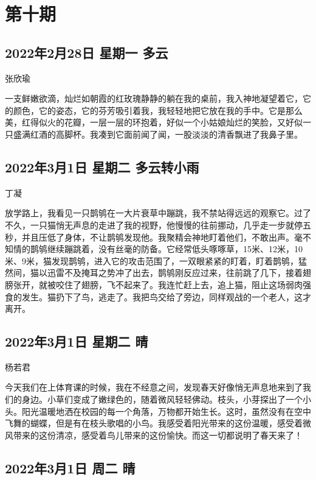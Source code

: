 \chapter{第十期}

\section{2022年2月28日 星期一 多云}

张欣瑜

一支鲜嫩欲滴，灿烂如朝霞的红玫瑰静静的躺在我的桌前，我入神地凝望着它，它的颜色，它的姿态，它的芬芳吸引着我，我轻轻地把它放在我的手中。它是那么美，红得似火的花瓣，一层一层的环抱着，好似一个小姑娘灿烂的笑脸，又好似一只盛满红酒的高脚杯。我凑到它面前闻了闻，一股淡淡的清香飘进了我鼻子里。

\section{2022年3月1日 星期二 多云转小雨}

丁凝

放学路上，我看见一只鹊鸲在一大片衰草中蹦跳，我不禁站得远远的观察它。过了不久，一只猫悄无声息的走进了我的视野，他慢慢的往前挪动，几乎走一步就停五秒，并且压低了身体，不让鹊鸲发现他。我聚精会神地盯着他们，不敢出声。毫不知情的鹊鸲继续蹦跳着，没有丝毫的防备。它经常低头啄啄草，15米、12米，10米、9米，猫发现鹊鸲，进入它的攻击范围了，一双眼紧紧的盯着，盯着鹊鸲，猛然间，猫以迅雷不及掩耳之势冲了出去，鹊鸲刚反应过来，往前跳了几下，接着翅膀张开，就被咬住了翅膀，飞不起来了。我连忙赶上去，追上猫，阻止这场弱肉强食的发生。猫扔下了鸟，逃走了。我把鸟交给了旁边，同样观战的一个老人，这才离开。

\section{2022年3月1日 星期二 晴}

杨若君

今天我们在上体育课的时候，我在不经意之间，发现春天好像悄无声息地来到了我们的身边。小草们变成了嫩绿色的，随着微风轻轻佛动。枝头，小芽探出了一个小头。阳光温暖地洒在校园的每一个角落，万物都开始生长。这时，虽然没有在空中飞舞的蝴蝶，但是有在枝头歌唱的小鸟。我感受着阳光带来的这份温暖，感受着微风带来的这份清凉，感受着鸟儿带来的这份愉快。而这一切都说明了春天来了！

\section{2022年3月1日 周二 晴}

